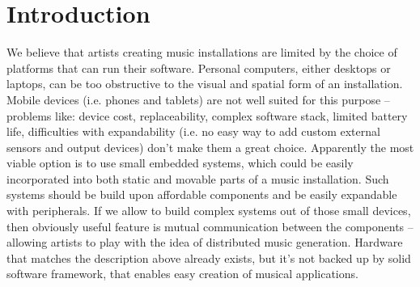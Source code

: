 \documentclass{article}
\title{\papertitle}
\begin{document}
\capstartfalse %
\maketitle %
\capstarttrue %

\begin{abstract}
Application of embedded systems to music installations is limited due to the
absence of convenient software development tools.  This is a very unfortunate
situation as these systems offer an array of advantages over desktop or laptop
computers.  Small size of embedded systems is a factor that makes them
especially suitable for incorporation into various forms of art.  These devices
are effortlessly expandable with various sensors and can produce rich
audio-visual effects.  Their low price makes it affordable to build and
experiment with networks of cooperating devices that generate music.

In this paper we describe the design of Komeda -- implementation platform for
interactive algorithmic music tailored for embedded systems.  The framework
consists of music description language, intermediate binary representation and
portable virtual machine with user defined extensions (called modules).
\end{abstract}

\section{Introduction}
\label{sec:introduction}
We believe that artists creating music installations are limited by the choice
of platforms that can run their software.  Personal computers, either desktops
or laptops, can be too obstructive to the visual and spatial form of an
installation.  Mobile devices (i.e. phones and tablets) are not well suited for
this purpose -- problems like: device cost, replaceability, complex software
stack, limited battery life, difficulties with expandability (i.e. no easy way
to add custom external sensors and output devices) don't make them a great
choice.  Apparently the most viable option is to use small embedded systems,
which could be easily incorporated into both static and movable parts of a
music installation.  Such systems should be build upon affordable components
and be easily expandable with peripherals.  If we allow to build complex
systems out of those small devices, then obviously useful feature is mutual
communication between the components -- allowing artists to play with the idea
of distributed music generation.  Hardware that matches the description above
already exists, but it's not backed up by solid software framework, that
enables easy creation of musical applications.
\end{document}
